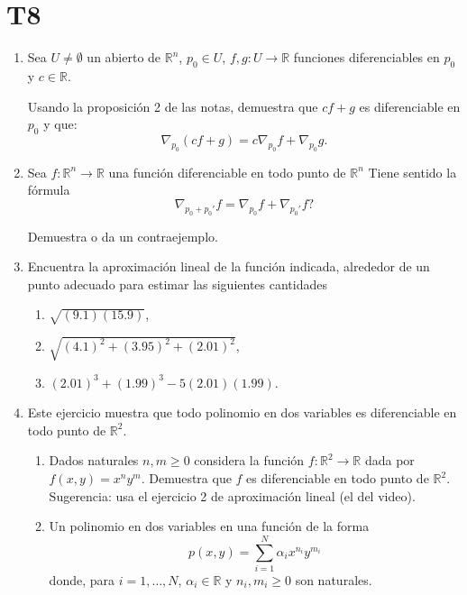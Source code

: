 \documentclass{article}
\theoremstyle{definition}
\begin{document}
\section*{T8 }

\begin{enumerate}
\item  Sea $U\ne \emptyset$ un abierto de $\mathbb{R}^n$, $p_0\in U$, $f,g :U \to \mathbb{R}$
  funciones diferenciables en $p_0$ y  $c\in \mathbb{R}$.

  Usando la proposici\'on 2 de las notas,  demuestra que $cf+g$ es diferenciable
  en $p_0$ y que:
  $$
  \nabla_{p_0}(cf+g)=c\nabla_{p_0} f+ \nabla_{p_0}g.
  $$

\item Sea $f:\mathbb{R}^n\to \mathbb{R}$
  una funci\'on diferenciable en todo punto de $\mathbb{R}^n$ \textquestiondown  Tiene sentido la f\'ormula
  $$
  \nabla_{p_0+p_0'}f=\nabla_{p_0}f+\nabla_{p_0'}f ?
  $$

  Demuestra o da un contraejemplo.

\item Encuentra la aproximaci\'on lineal de la funci\'on indicada, alrededor de un punto adecuado
  para estimar  las siguientes cantidades
  \begin{enumerate}
  \item $\sqrt{(9.1)(15.9)}$,
  \item $\sqrt{(4.1)^2+(3.95)^2+(2.01)^2}$,
  \item $(2.01)^3+(1.99)^3-5(2.01)(1.99)$.
  \end{enumerate}

  
          \item\label{Ejer:DifPolinomios}
            Este ejercicio muestra que todo polinomio en dos variables es diferenciable en todo
            punto de $\mathbb{R}^2$.

            \begin{enumerate}
            \item Dados naturales $n,m\geq 0$ considera la funci\'on $f:\mathbb{R}^2\to \mathbb{R}$
              dada por $f(x,y)=x^ny^m$. Demuestra que $f$ es diferenciable en todo punto de $\mathbb{R}^2$.  Sugerencia: usa el ejercicio 2 de aproximaci\'on
              lineal (el del video). 

             

            \item Un polinomio en dos variables en una funci\'on de la forma
              $$
              p(x,y)= \sum_{i=1}^N \alpha_i x^{n_i}y^{m_i}
              $$
              donde, para $i=1,\dots, N$,  $\alpha_i\in \mathbb{R}$ y $n_i,m_i\geq 0$ son naturales.


\end{enumerate}
\end{enumerate}
\end{document}
